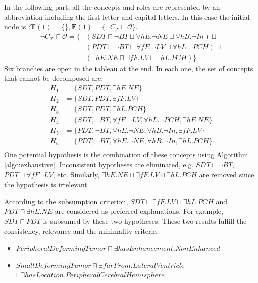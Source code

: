 \documentclass{article}
\begin{document}
In the following part, all the concepts and roles are represented by an abbreviation including the first letter and capital letters.
In this case the initial node is :$\mathbf{T}(1)=\{\}, \mathbf{F}(1)=\{\neg C_\mathcal{T}\sqcap \mathcal{O}\}$.
\begin{align*}
 \neg C_\mathcal{T}\sqcap \mathcal{O}= \{ &(SDT \sqcap \neg BT \sqcup \forall hE. \neg NE \sqcup \forall hB. \neg In) \sqcup \\
 &(PDT \sqcap \neg BT \sqcup \forall fF. \neg LV \sqcup \forall hL. \neg PCH) \sqcup \\
 &(\exists hE. NE \sqcap \exists fF. LV \sqcup \exists hL.PCH )\}
\end{align*}
Six branches are open in the tableau at the end. In each one, the set of concepts that cannot be decomposed are:
 \begin{align*}
  H_1&=\{ SDT, PDT, \exists hE.NE\}\\
  H_2&=\{ SDT, PDT, \exists fF.LV\}\\
  H_3&=\{ SDT, PDT, \exists hL.PCH\}\\
  H_4&=\{ SDT, \neg BT, \forall fF. \neg LV, \forall hL. \neg PCH, \exists hE.NE\}\\
  H_5&=\{ PDT, \neg BT, \forall hE. \neg NE, \forall hB. \neg In, \exists fF.LV\}\\
  H_6&=\{ PDT, \neg BT, \forall hE. \neg NE, \forall hB. \neg In, \exists hL.PCH\}\\
 \end{align*}
One potential hypothesis is the combination of these concepts using Algorithm \ref{algo:exhaustive}.
Inconsistent hypotheses are eliminated, e.g.
 $SDT \sqcap \neg BT$, 
$PDT \sqcap \forall fF \neg LV$, etc.
Similarly,
$\exists hE. NE \sqcap \exists fF. LV \sqcup \exists hL.PCH $
are removed since the hypothesis is irrelevant.

According to the subsumption criterion, $SDT \sqcap \exists fF.LV \sqcap \exists hL.PCH$
and $PDT \sqcap \exists hE.NE$ are considered as preferred explanations. For example, 
$SDT \sqcap PDT$ is subsumed by these two hypotheses. 
These two results fulfill the consistency, relevance and the minimality criteria:
\begin{itemize}
 \item $PeripheralDeformingTumor \sqcap \exists hasEnhancement. NonEnhanced$
 \item $SmallDeformingTumor\sqcap \exists farFrom. LateralVentricle $\\ $\sqcap \exists hasLocation. PeripheralCerebralHemisphere$
\end{itemize}




\end{document}
